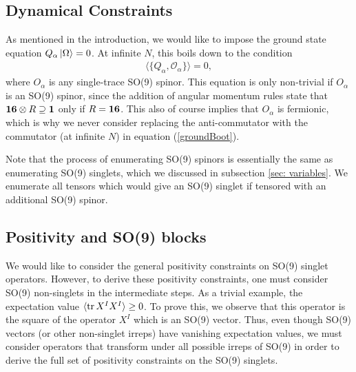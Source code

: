 \documentclass[11pt]{article}
\def\la{\label}
\def\nref#1{(\ref{#1})}
\renewcommand{\ev}[1]{\langle #1 \rangle} %
\def\i{\mathrm{i}}
\begin{document}
\subsection{Dynamical Constraints}
As mentioned in the introduction, we would like to impose the ground state equation $Q_\alpha \ket{\Omega} = 0$. At infinite $N$, this boils down to the condition
\begin{align}
    \langle \{ Q_\alpha , \mathcal{O}_\alpha \} \rangle = 0, \la{groundBoot} %
\end{align}
where $O_\alpha$ is any single-trace SO(9) spinor. This equation is only non-trivial if $O_\alpha$ is an SO(9) spinor, since the addition of angular momentum rules state that ${\bf 16} \otimes R \supseteq  {\bf 1}$ only if $R = {\bf 16}$. This also of course implies that $O_\alpha$ is fermionic, which is why we never consider replacing the anti-commutator with the commutator (at infinite $N$) in equation \nref{groundBoot}. %

Note that the process of enumerating SO(9) spinors is essentially the same as enumerating SO(9) singlets, which we discussed in subsection \ref{sec: variables}. We enumerate all tensors which would give an SO(9) singlet if tensored with an additional SO(9) spinor.


\subsection{Positivity and SO(9) blocks}
\def\RR{\mathcal{R}}
\def\O{\mathcal{O}}
\def\i{\mathbf{i}}
\def\j{\mathbf{j}}

We would like to consider the general positivity constraints on SO(9) singlet operators. However, to derive these positivity constraints, one must consider SO(9) non-singlets in the intermediate steps. As a trivial example, the expectation value $\ev{\tr X^I X^I} \ge 0 $. To prove this, we observe that this operator is the square of the operator $X^I$ which is an SO(9) vector. Thus, even though SO(9) vectors (or other non-singlet irreps) have vanishing expectation values, we must consider operators that transform under all possible irreps of SO(9) in order to derive the full set of positivity constraints on the SO(9) singlets.
\end{document}
